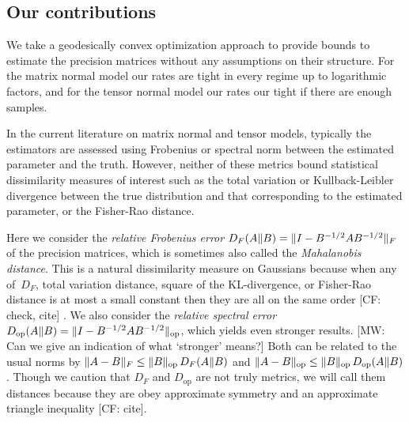 \documentclass[aos]{imsart}
\theoremstyle{definition}
\numberwithin{equation}{section}
\DeclareMathOperator{\op}{op}
\DeclarePairedDelimiter{\norm}{\lVert}{\rVert}
\newcommand{\CF}[1]{{\color{purple}[CF: #1]}}
\newcommand{\MW}[1]{{\color{red}[MW: #1]}}
\begin{document}
\subsection{Our contributions}
We take a geodesically convex optimization approach to provide bounds to estimate the precision matrices without any assumptions on their structure.
For the matrix normal model our rates are tight in every regime up to logarithmic factors, and for the tensor normal model our rates our tight if there are enough samples.

In the current literature on matrix normal and tensor models, typically the estimators are assessed using Frobenius or spectral norm between the estimated parameter and the truth.
However, neither of these metrics bound statistical dissimilarity measures of interest such as the total variation or Kullback-Leibler divergence between the true distribution and that corresponding to the estimated parameter, or the Fisher-Rao distance.

Here we consider the \emph{relative Frobenius error} $D_F(A \Vert B) = \norm{I - B^{-1/2} A B^{-1/2}}_F$ of the precision matrices, which is sometimes also called the \emph{Mahalanobis distance}.
This is a natural dissimilarity measure on Gaussians because when any of~$D_F$, total variation distance, square of the KL-divergence, or Fisher-Rao distance is at most a small constant then they are all on the same order \CF{check, cite} \citep{barsov1987estimates}.
We also consider the \emph{relative spectral error} $D_{\op}(A \Vert B) = \norm{I - B^{-1/2} A B^{-1/2}}_{\op}$, which yields even stronger results.
\MW{Can we give an indication of what `stronger' means?}
Both can be related to the usual norms by $\norm{A - B}_F \leq \norm{B}_{\op} \, D_F(A\Vert B)$ and $\norm{A  - B}_{\op} \leq \norm{B}_{\op} \, D_{\op}(A \Vert B)$.
Though we caution that $D_F$ and $D_{\op}$ are not truly metrics, we will call them distances because they are obey approximate symmetry and an approximate triangle inequality \CF{cite}.
\end{document}
